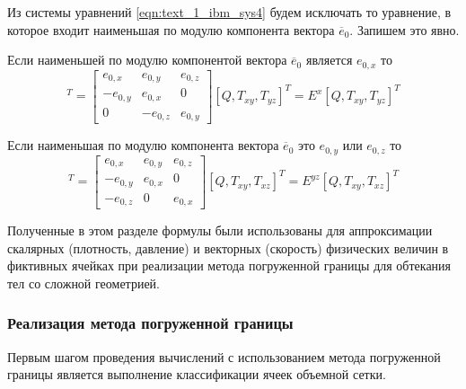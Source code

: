 Из системы уравнений \eqref{eqn:text_1_ibm_sys4} будем исключать то уравнение, в которое входит наименьшая по модулю компонента вектора $\overline{e}_0$.
Запишем это явно.

Если наименьшей по модулю компонентой вектора $\overline{e}_0$ является $e_{0,x}$ то
\begin{equation}
	[v_{G,x}, v_{G,y}, v_{G,z}]^T =
	\begin{bmatrix}
		e_{0,x} & e_{0,y} & e_{0,z} \\
		-e_{0,y} & e_{0,x} & 0 \\
		0 & -e_{0,z} & e_{0,y}
	\end{bmatrix}
	[Q, T_{xy}, T_{yz}]^T = E^x[Q, T_{xy}, T_{yz}]^T
\end{equation}

Если наименьшая по модулю компонента вектора $\overline{e}_0$ это $e_{0,y}$ или $e_{0,z}$ то
\begin{equation}
	[v_{G,x}, v_{G,y}, v_{G,z}]^T =
	\begin{bmatrix}
		e_{0,x} & e_{0,y} & e_{0,z} \\
		-e_{0,y} & e_{0,x} & 0 \\
		-e_{0,z} & 0 & e_{0,x}
	\end{bmatrix}
	[Q, T_{xy}, T_{xz}]^T = E^{yz}[Q, T_{xy}, T_{xz}]^T
\end{equation}

Полученные в этом разделе формулы были использованы для аппроксимации скалярных (плотность, давление) и векторных (скорость) физических величин в фиктивных ячейках при реализации метода погруженной границы для обтекания тел со сложной геометрией.

\subsubsection{Реализация метода погруженной границы}\label{sec:text_1_immersed_boundary_method_realization}

Первым шагом проведения вычислений с использованием метода погруженной границы является выполнение классификации ячеек объемной сетки.

